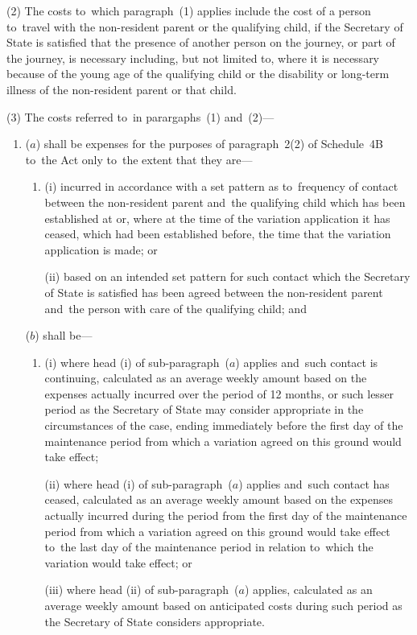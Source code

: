 \documentclass[12pt,a4paper]{article}
\begin{document}
(2) The costs to~which paragraph~(1) applies include the cost of a person to~travel with the non-resident parent or the qualifying child, if the Secretary of State is satisfied that the presence of another person on the journey, or part of the journey, is necessary including, but not limited to, where it is necessary because of the young age of the qualifying child or the disability or long-term illness of the non-resident parent or that child.

(3) The costs referred to~in parargaphs~(1) and~(2)—
\begin{enumerate}\item[]
($a$) shall be expenses for the purposes of paragraph~2(2) of Schedule~4B to~the Act only to~the extent that they are—
\begin{enumerate}\item[]
(i) incurred in accordance with a set pattern as to~frequency of contact between the non-resident parent and~the qualifying child which has been established at or, where at the time of the variation application it has ceased, which had been established before, the time that the variation application is made; or

(ii) based on an intended set pattern for such contact which the Secretary of State is satisfied has been agreed between the non-resident parent and~the person with care of the qualifying child; and
\end{enumerate}

($b$) shall be—
\begin{enumerate}\item[]
(i) where head (i)  of sub-paragraph~($a$)  applies and~such contact is continuing, calculated as an average weekly amount based on the expenses actually incurred over the period of 12 months, or such lesser period as the Secretary of State may consider appropriate in the circumstances of the case, ending immediately before the first day of the maintenance period from which a variation agreed on this ground would take effect;

(ii) where head (i)  of sub-paragraph~($a$)  applies and~such contact has ceased, calculated as an average weekly amount based on the expenses actually incurred during the period from the first day of the maintenance period from which a variation agreed on this ground would take effect to~the last day of the maintenance period in relation to~which the variation would take effect; or

(iii) where head (ii)  of sub-paragraph~($a$)  applies, calculated as an average weekly amount based on anticipated costs during such period as the Secretary of State considers appropriate.
\end{enumerate}
\end{enumerate}
\end{document}
